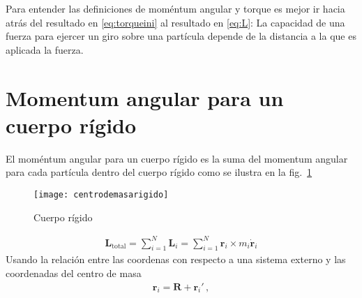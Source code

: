 Para entender las definiciones de moméntum angular y torque es mejor
ir hacia atrás del resultado en \eqref{eq:torqueini} al resultado en
\eqref{eq:L}: La capacidad de una fuerza para ejercer un giro sobre
una partícula depende de la distancia a la que es aplicada la fuerza.

\section{Momentum angular para un cuerpo rígido}


El moméntum angular para un cuerpo rígido es la suma del momentum
angular para cada partícula dentro del cuerpo rígido como se ilustra
en la fig.~\ref{fig:centrodemasarigido}

\begin{frame}
\begin{figure}
  \centering
  \texttt{[image: centrodemasarigido]}
  \caption{Cuerpo rígido}
  \label{fig:centrodemasarigido}
\end{figure}
\end{frame}
\begin{align}
  \mathbf{L}_{\text{total}}=\sum_{i=1}^N\mathbf{L}_i=\sum_{i=1}^N \mathbf{r}_i\times m_i\dot{\mathbf{r}}_i
\end{align}
Usando la relación entre las coordenas con respecto a una sistema
externo y las coordenadas del centro de masa
\begin{align}
  \mathbf{r}_i=\mathbf{R}+\mathbf{r}_i'\,,
\end{align}

